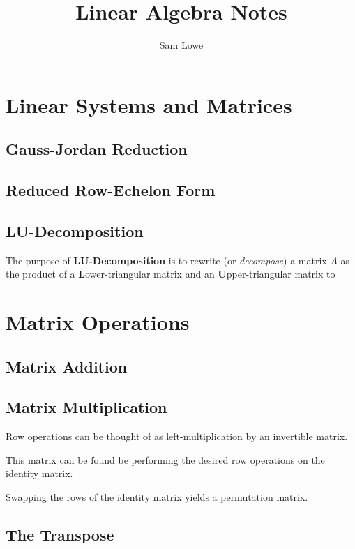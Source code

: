 \documentclass[12pt]{article}
\title{Linear Algebra Notes}
\author{Sam Lowe}
\begin{document}
\maketitle

\tableofcontents

\pagebreak

\section{Linear Systems and Matrices}

\subsection{Gauss-Jordan Reduction}

\subsection{Reduced Row-Echelon Form}

\subsection{LU-Decomposition}

The purpose of \textbf{LU-Decomposition} is to rewrite (or \textit{decompose}) a matrix $A$ as the product of a \textbf{L}ower-triangular matrix and an \textbf{U}pper-triangular matrix to

\section{Matrix Operations}

\subsection{Matrix Addition}

\subsection{Matrix Multiplication}


Row operations can be thought of as left-multiplication by an invertible matrix.

This matrix can be found be performing the desired row operations on the identity matrix.

Swapping the rows of the identity matrix yields a permutation matrix.

\subsection{The Transpose}
	
\end{document}
